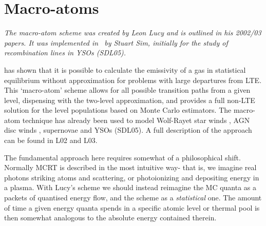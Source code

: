 
\section{Macro-atoms}

{\sl The macro-atom scheme was created by Leon Lucy and is outlined in 
his 2002/03 papers. It was implemented in \py\ by Stuart Sim, initially
for the study of recombination lines in YSOs (SDL05).
}

\citet[][hereafter L02, L03]{lucy2002, lucy2003}
has shown that it is possible to calculate the emissivity of a gas in
statistical equilibrium without approximation for problems with large departures
from LTE.
This `macro-atom' scheme allows for all possible transition paths from a given level,
dispensing with the two-level approximation, and
provides a full non-LTE solution
for the level populations based on Monte Carlo estimators. The macro-atom
technique has already been used to model Wolf-Rayet star
winds \citep{sim2004}, AGN disc winds \citep{simlong2008, tatum2012},
supernovae \citep{kromersim2009, kerzendorfsim} and YSOs (SDL05). A full 
description of the approach can be found in L02 and L03. 

The fundamental approach here requires somewhat of a philosophical shift.
Normally MCRT is described in the most intuitive way- that is, we imagine
real photons striking atoms and scattering, or photoionizing 
and depositing energy in a plasma. With Lucy's scheme we should instead 
reimagine the MC quanta as a packets of quantised energy flow, and the scheme as a 
{\em statistical} one. The amount of time a given energy quanta spends in a specific atomic
level or thermal pool is then somewhat analogous to the absolute energy 
contained therein.

